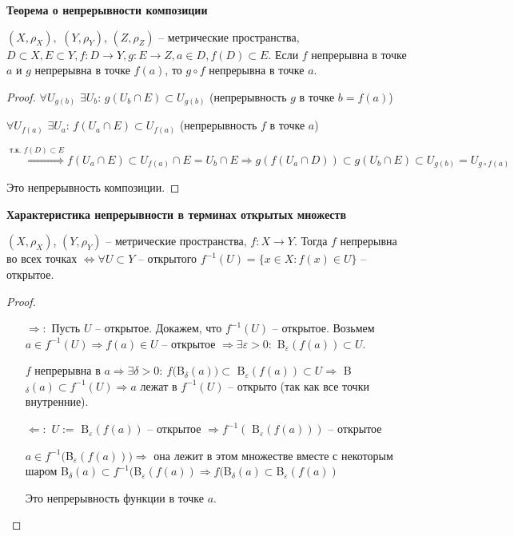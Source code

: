 \begin{theorem}
    \textbf{Теорема о непрерывности композиции}

    $(X, \rho_X),$ $(Y, \rho_Y)$, $(Z, \rho_Z)$ – метрические пространства, $D\subset X, E\subset Y, f:D\rightarrow Y, g:E\rightarrow Z, a\in D, f(D)\subset E$. Если $f$ непрерывна в точке $a$ и $g$ непрерывна в точке $f(a)$, то $g\circ f$ непрерывна в точке $a$.
\end{theorem}

\begin{proof}
    $\forall U_{g(b)}$ $\exists U_b$: $g(U_b \cap E)\subset U_{g(b)}$ (непрерывность $g$ в точке $b=f(a)$)

    $\forall U_{f(a)}$ $\exists U_a$: $f(U_a \cap E)\subset U_{f(a)}$ (непрерывность $f$ в точке $a$)

    $\overset{\text{т.к. }f(D)\subset E}{\Rightarrow} f(U_a \cap E)\subset U_{f(a)}\cap E = U_b\cap E\Rightarrow g(f(U_a \cap D))\subset g(U_b\cap E)\subset U_{g(b)}=U_{g\circ f(a)}$

    Это непрерывность композиции.
\end{proof}

\begin{theorem}
    \textbf{Характеристика непрерывности в терминах открытых множеств}

    $(X, \rho_X)$, $(Y,  \rho_Y)$ – метрические пространства, $f:X\rightarrow Y$. Тогда $f$ непрерывна во всех точках $\Leftrightarrow\forall U\subset Y$ – открытого $f^{-1}(U)=\{x\in X:f(x)\in U\}$ – открытое.
\end{theorem}

\begin{proof}~
    \begin{enumerate}
        \item[$\Rightarrow:$] Пусть $U$ – открытое. Докажем, что $f^{-1}(U)$ – открытое. Возьмем $a\in f^{-1}(U)\Rightarrow f(a)\in U$ – открытое  $\Rightarrow \exists \varepsilon > 0:$ B$_\varepsilon (f(a))\subset U$.

        $f$ непрерывна в $a\Rightarrow \exists \delta >0:\ f($B$_\delta(a))\subset\text{ B}_\varepsilon(f(a))\subset U\Rightarrow$ B$_\delta(a)\subset f^{-1}(U)\Rightarrow a$ лежат в $f^{-1}(U)$ – открыто (так как все точки внутренние).

        \item[$\Leftarrow:$]$U:=\text{ B}_\varepsilon(f(a))$ – открытое $\Rightarrow f^{-1}(\text{ B}_\varepsilon(f(a)))$ – открытое

        $a\in f^{-1}($B$_\varepsilon(f(a)))\Rightarrow$ она лежит в этом множестве вместе с некоторым шаром B$_\delta (a)\subset f^{-1}($B$_\varepsilon(f(a))\Rightarrow f($B$_\delta(a)\subset$B$_\varepsilon(f(a))$
    
        Это непрерывность функции в точке $a$.
    \end{enumerate}
\end{proof}

